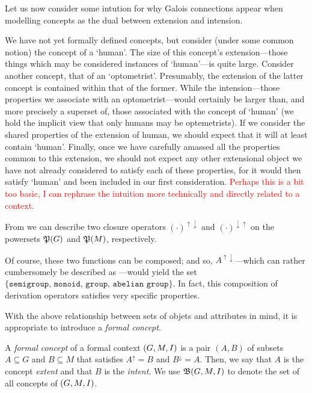 Let us now consider some intution for why Galois connections appear when modelling concepts as the dual between extension and intension.

We have not yet formally defined concepts, but consider (under some common notion) the concept of a `human'. The size of this concept's extension---those things which may be considered instances of `human'---is quite large. Consider another concept, that of an `optometrist'. Presumably, the extension of the latter concept is contained within that of the former. While the intension---those properties we associate with an optometrist---would certainly be larger than, and more precisely a superset of, those associated with the concept of `human' (we hold the implicit view that only humans may be optemetrists). If we consider the shared properties of the extension of human, we should expect that it will at least contain `human'. Finally, once we have carefully amassed all the properties common to this extension, we should not expect any other extensional object we have not already considered to satisfy each of these properties, for it would then satisfy `human' and been included in our first consideration. \textcolor{red}{Perhaps this is a bit too basic, I can rephrase the intuition more technically and directly related to a context.}



From  we can describe two closure operators $(\cdot)^{\uparrow \downarrow}$ and $(\cdot)^{\downarrow \uparrow}$ on the powersets $\mathfrak{P}({G})$ and $\mathfrak{P}({M})$, respectively.



Of course, these two functions can be composed; and so, $A^{\uparrow \downarrow}$---which can rather cumbersomely be described as ---would yield the set $\{\texttt{semigroup, monoid, group, abelian group}\}$. In fact, this composition of derivation operators satisfies very specific properties.%

With the above relationship between sets of objets and attributes in mind, it is appropriate to introduce a \textit{formal concept}.

\begin{definition}
  \label{definition:formal-concept} 
  A \textit{formal concept} of a formal context $(G,M,\mathrel{I})$  is a pair $(A,B)$ of subsets $A \subseteq G$ and $B \subseteq M$ that satisfies $A^\uparrow = B$ and $B^\downarrow = A$. Then, we say that $A$ is the concept \textit{extent} and that $B$ is the \textit{intent}. We use ${\mathfrak B} (G,M,\mathrel{I})$ to denote the set of all concepts of $(G,M,\mathrel{I})$.
\end{definition}

